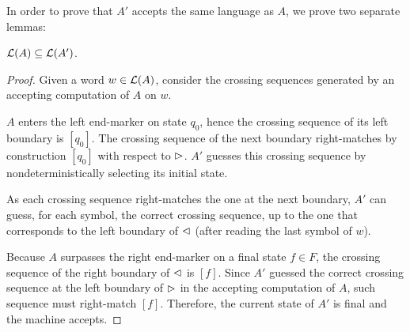 In order to prove that $A'$ accepts the same language as $A$, we prove two separate lemmas:
\begin{lemm}\label{lem:2DFAto1NFA-1}
	$\mathcal L(A)\subseteq\mathcal L(A')$.
\end{lemm}
\begin{proof}
	Given a word $w\in\mathcal L(A)$, consider the crossing sequences generated by an accepting computation of $A$ on $w$.

	$A$ enters the left end-marker on state $q_0$, hence the crossing sequence of its left boundary is $[q_0]$.
	The crossing sequence of the next boundary right-matches by construction $[q_0]$ with respect to $\rhd$.
	$A'$ guesses this crossing sequence by nondeterministically selecting its initial state.

	As each crossing sequence right-matches the one at the next boundary, $A'$ can guess, for each symbol, the correct crossing sequence, up to the one that corresponds to the left boundary of $\lhd$ (after reading the last symbol of $w$).

	Because $A$ surpasses the right end-marker on a final state $f\in F$, the crossing sequence of the right boundary of $\lhd$ is $[f]$.
	Since $A'$ guessed the correct crossing sequence at the left boundary of $\rhd$ in the accepting computation of $A$, such sequence must right-match $[f]$.
	Therefore, the current state of $A'$ is final and the machine accepts.
\end{proof}


